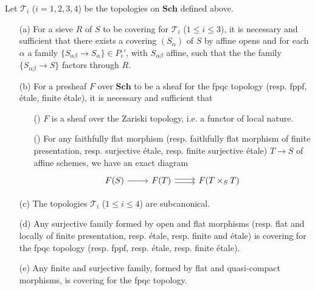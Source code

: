 \begin{proposition}\label{scheme topology on Sch by refining family prop}
Let $\mathcal{T}_i$ ($i=1,2,3,4$) be the topologies on $\mathbf{Sch}$ defined above.
\begin{enumerate}
    \item[(a)] For a sieve $R$ of $S$ to be covering for $\mathcal{T}_i$ ($1\leq i\leq 3$), it is necessary and sufficient that there exists a covering $(S_\alpha)$ of $S$ by affine opens and for each $\alpha$ a family $\{S_{\alpha\beta}\to S_\alpha\}\in P_i'$, with $S_{\alpha\beta}$ affine, such that the the family $\{S_{\alpha\beta}\to S\}$ factors through $R$.
    \item[(b)] For a presheaf $F$ over $\mathbf{Sch}$ to be a sheaf for the fpqc topology (resp. fppf, \'etale, finite \'etale), it is necessary and sufficient that
    \begin{enumerate}
        \item[(\rmnum{1})] $F$ is a sheaf over the Zariski topology, i.e. a functor of local nature.
        \item[(\rmnum{2})] For any faithfully flat morphism (resp. faithfully flat morphism of finite presentation, resp. surjective \'etale, resp. finite surjective \'etale) $T\to S$ of affine schemes, we have an exact diagram
        \[\begin{tikzcd}
        F(S)\ar[r]&F(T)\ar[r,shift left=2pt]\ar[r,shift right=2pt]&F(T\times_ST)
        \end{tikzcd}\]
    \end{enumerate}   
    \item[(c)] The topologies $\mathcal{T}_i$ ($1\leq i\leq 4$) are subcanonical.
    \item[(d)] Any surjective family formed by open and flat morphisms (resp. flat and locally of finite presentation, resp. \'etale, resp. finite and \'etale) is covering for the fpqc topology (resp. fppf, resp. \'etale, resp. finite \'etale).
    \item[(e)] Any finite and surjective family, formed by flat and quasi-compact morphisms, is covering for the fpqc topology. 
\end{enumerate}
\end{proposition}

